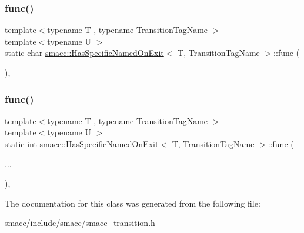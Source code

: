 \subsubsection{\texorpdfstring{func()}{func()}\hspace{0.1cm}{\footnotesize\ttfamily [1/2]}}
{\footnotesize\ttfamily template$<$typename T , typename Transition\+Tag\+Name $>$ \\
template$<$typename U $>$ \\
static char \hyperlink{classsmacc_1_1HasSpecificNamedOnExit}{smacc\+::\+Has\+Specific\+Named\+On\+Exit}$<$ T, Transition\+Tag\+Name $>$\+::func (\begin{DoxyParamCaption}\item[{\hyperlink{structsmacc_1_1HasSpecificNamedOnExit_1_1Check}{Check}$<$ U, \&U\+::on\+Exit $>$ $\ast$}]{ }\end{DoxyParamCaption})\hspace{0.3cm}{\ttfamily [static]}, {\ttfamily [private]}}

\mbox{\label{classsmacc_1_1HasSpecificNamedOnExit_a5df0edab149c42bfd6e5a7221150095a}} 
\subsubsection{\texorpdfstring{func()}{func()}\hspace{0.1cm}{\footnotesize\ttfamily [2/2]}}
{\footnotesize\ttfamily template$<$typename T , typename Transition\+Tag\+Name $>$ \\
template$<$typename U $>$ \\
static int \hyperlink{classsmacc_1_1HasSpecificNamedOnExit}{smacc\+::\+Has\+Specific\+Named\+On\+Exit}$<$ T, Transition\+Tag\+Name $>$\+::func (\begin{DoxyParamCaption}\item[{}]{... }\end{DoxyParamCaption})\hspace{0.3cm}{\ttfamily [static]}, {\ttfamily [private]}}



The documentation for this class was generated from the following file\+:\begin{DoxyCompactItemize}
\item 
smacc/include/smacc/\hyperlink{smacc__transition_8h}{smacc\+\_\+transition.\+h}\end{DoxyCompactItemize}
